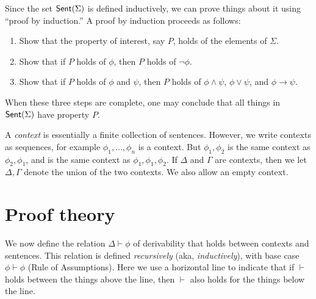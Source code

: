 Since the set $\mathsf{Sent}(\Sigma )$ is defined inductively, we can prove things
about it using ``proof by induction.''  A proof by induction proceeds
as follows: \begin{enumerate}
\item Show that the property of interest, say $P$, holds of the
  elements of $\Sigma$.
\item Show that if $P$ holds of $\phi$, then $P$ holds of $\neg \phi$.
\item Show that if $P$ holds of $\phi$ and $\psi$, then $P$ holds of
  $\phi\wedge \psi$, $\phi\vee \psi$, and $\phi\to
  \psi$. \end{enumerate} When these three steps are complete, one may
conclude that all things in $\mathsf{Sent}(\Sigma )$ have property $P$.



\begin{defn} A \emph{context} is essentially a finite collection of
  sentences.  However, we write contexts as sequences, for example
  $\phi _1,\dots ,\phi _n$ is a context.  But $\phi _1,\phi _2$ is the
  same context as $\phi _2,\phi _1$, and is the same context as $\phi
  _1,\phi _1,\phi _2$.  If $\Delta$ and $\Gamma$ are contexts, then we
  let $\Delta ,\Gamma$ denote the union of the two contexts.  We also
  allow an empty context.  \end{defn}

\section{Proof theory} \label{sec:pt}

We now define the relation $\Delta\vdash \phi$ of derivability that
holds between contexts and sentences.  This relation is defined
\emph{recursively} (aka, \emph{inductively}), with base case
$\phi\vdash\phi$ (Rule of Assumptions).  Here we use a horizontal line
to indicate that if $\vdash$ holds between the things above the line,
then $\vdash$ also holds for the things below the line.


